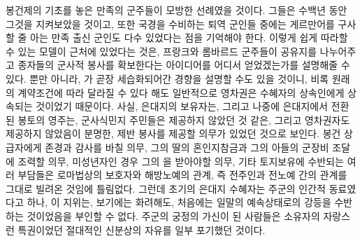 봉건제의 기초를 놓은
만족의 군주들이 모방한 선례였을 것이다.
그들은 수백년 동안 그것을 지켜보았을 것이고,
또한 국경을 수비하는 퇴역 군인들 중에는
게르만어를 구사할 줄 아는 만족 출신 군인도 다수 있었다는 점을
기억해야 한다.
이렇게 쉽게 따라할 수 있는 모델이 근처에 있었다는 것은,
프랑크와 롬바르드 군주들이
공유지를 나누어주고 종자들의 군사적 봉사를 확보한다는
아이디어를 어디서 얻었겠는가를
설명해줄 수 있다.
뿐만 아니라,
가
곧장 세습화되어간
경향을
설명할 수도 있을 것이니,
비록 원래의 계약조건에 따라 달라질 수 있다 해도
일반적으로 영차권은 수혜자의 상속인에게 상속되는 것이었기 때문이다.
사실,
은대지의 보유자는,
그리고 나중에 은대지에서 전환된 봉토의 영주는,
군사식민지 주민들은 제공하지 않았던 것 같은,
그리고 영차권자도 제공하지 않았음이 분명한,
제반 봉사를
제공할 의무가 있었던 것으로 보인다.
봉건 상급자에게 존경과 감사를 바칠 의무,
그의 딸의 혼인지참금과 그의 아들의 군장비 조달에 조력할 의무,
미성년자인 경우 그의 을 받아야할 의무,
기타 토지보유에 수반되는 여러 부담들은
로마법상의 보호자와 해방노예의 관계,
즉 전주인과 전노예 간의 관계를
그대로 빌려온 것임에 틀림없다.
그런데 초기의 은대지 수혜자는
주군의 인간적 동료였다고 하나,
이 지위는,
보기에는 화려해도,
처음에는 일말의 예속상태로의 강등을 수반하는 것이었음을
부인할 수 없다.
주군의 궁정의 가신이 된 사람들은
 소유자의 자랑스런 특권이었던
절대적인 신분상의 자유를 일부 포기했던 것이다.

